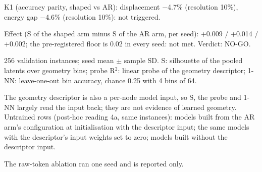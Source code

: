 \begin{table}[t]
\centering
\small
\caption{E1 (2D): SIGReg latent shaping of the label-free AR objective. Accuracy of the AR cell and separation readings of the pooled latents.}
\label{tab:e1}

\smallskip
\begin{minipage}{\linewidth}\footnotesize\raggedright
K1 (accuracy parity, shaped vs AR): displacement $-$4.7\% (resolution 10\%), energy gap $-$4.6\% (resolution 10\%): not triggered.\par
Effect (S of the shaped arm minus S of the AR arm, per seed): +0.009 / +0.014 / +0.002; the pre-registered floor is 0.02 in every seed: not met. Verdict: NO-GO.\par
256 validation instances; seed mean $\pm$ sample SD. S: silhouette of the pooled latents over geometry bins; probe R$^2$: linear probe of the geometry descriptor; 1-NN: leave-one-out bin accuracy, chance 0.25 with 4 bins of 64.\par
The geometry descriptor is also a per-node model input, so S, the probe and 1-NN largely read the input back; they are not evidence of learned geometry. Untrained rows (post-hoc reading 4a, same instances): models built from the AR arm's configuration at initialisation with the descriptor input; the same models with the descriptor's input weights set to zero; models built without the descriptor input.\par
The raw-token ablation ran one seed and is reported only.
\end{minipage}
\end{table}
